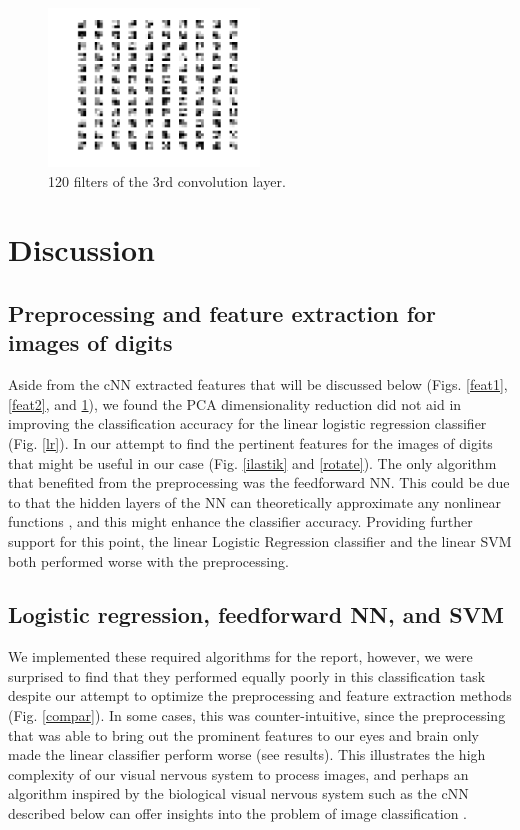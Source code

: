 \documentclass[conference]{IEEEtran}
\begin{document}
\begin{figure}[H]
\centering
\includegraphics[width=0.5\textwidth]{feature3.png}
\caption{\scriptsize 120 filters of the 3rd convolution layer.}
\label{feat3}
\end{figure}

\section{Discussion}
\subsection{Preprocessing and feature extraction for images of digits}
Aside from the cNN extracted features that will be discussed below (Figs. \ref{feat1}, \ref{feat2}, and \ref{feat3}), we found the PCA dimensionality reduction did not aid in improving the classification accuracy for the linear logistic regression classifier (Fig. \ref{lr}). In our attempt to find the pertinent features for the images of digits that might be useful in our case (Fig. \ref{ilastik} and \ref{rotate}). The only algorithm that benefited from the preprocessing was the feedforward NN. This could be due to that the hidden layers of the NN can theoretically approximate any nonlinear functions \cite{Min69, grossberg1973ces}, and this might enhance the classifier accuracy. Providing further support for this point, the linear Logistic Regression classifier and the linear SVM both performed worse with the preprocessing.

\subsection{Logistic regression, feedforward NN, and SVM}
We implemented these required algorithms for the report, however, we were surprised to find that they performed equally poorly in this classification task despite our attempt to optimize the preprocessing and feature extraction methods (Fig. \ref{compar}). In some cases, this was counter-intuitive, since the preprocessing that was able to bring out the prominent features to our eyes and brain only made the linear classifier perform worse (see results). This illustrates the high complexity of our visual nervous system to process images, and perhaps an algorithm inspired by the biological visual nervous system such as the cNN described below can offer insights into the problem of image classification \cite{lecun-98}.
\end{document}
